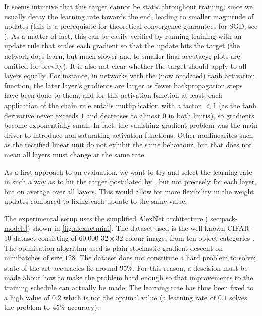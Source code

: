 It seems intuitive that this target cannot be static throughout training, since
we usually decay the learning rate towards the end, leading to smaller magnitude
of updates (this is a prerequisite for theoretical convergence guarantees for
SGD, see \citet[p. 20]{saad1998online}). As a matter of fact, this can be easily
verified by running training with an update rule that scales each gradient so
that the update hits the target (the network does learn, but much slower and to
smaller final accutacy; plots are omitted for brevity). It is also not clear
whether the target should apply to all layers equally. For instance, in networks
with the (now outdated) tanh activation function, the later layer's gradients
are larger as fewer backpropagation steps have been done to them, and for this
activation function at least, each application of the chain rule entails
mutliplication with a factor $< 1$ (as the tanh derivative never exceeds $1$ and
decreases to almost $0$ in both limtis), so gradients become exponentially
small. In fact, the vanishing gradient problem was the main driver to introduce
non-saturating activation functions.  Other nonlinearites such as the rectified
linear unit do not exhibit the same behaviour, but that does not mean all layers
must change at the same rate.

As a first approach to an evaluation, we want to try and select the learning
rate in such a way as to hit the target postulated by
\citeauthor{karpathycs231n}, but not precisely for each layer, but on average
over all layers. This would allow for more flexibility in the weight updates
compared to fixing each update to the same value.

The experimental setup uses the simplified AlexNet architecture
(\cref{sec:pack-models}) shown in \cref{fig:alexnetmini}. The dataset used is
the well-known CIFAR-10 dataset consisting of $60.000$ $32\times32$ colour images
from ten object categories \citep{krizhevsky2009learning}. The opimisation
alogrithm used is plain stochastic gradient descent on minibatches of size $128$. The
dataset does not constitute a hard problem to solve; state of the art accuracies
lie around $95\%$. For this reason, a descision must be made about how to make
the problem hard enough so that improvements to the training schedule can
actually be made. The learning rate has thus been fixed to a high value of $0.2$
which is not the optimal value (a learning rate of $0.1$ solves the problem to
$45\%$ accuracy).

